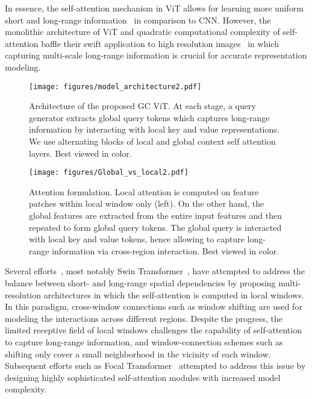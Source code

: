 \documentclass{article}
\theoremstyle{plain}
\theoremstyle{definition}
\theoremstyle{remark}
\begin{document}
In essence, the self-attention mechanism in ViT allows for learning more uniform short and long-range information~\citep{raghu2021vision} in comparison to CNN. However, the monolithic architecture of ViT and quadratic computational complexity of self-attention baffle their swift application to high resolution images~\citep{yang2021nvit} in which capturing multi-scale long-range information is crucial for accurate representation modeling. 

\begin{figure*}[t!]
\centering
    \texttt{[image: figures/model\_architecture2.pdf]}
  \caption{Architecture of the proposed GC ViT. At each stage, a query generator extracts global query tokens which captures long-range information by interacting with local key and value representations. We use alternating blocks of local and global context self attention layers. Best viewed in color.}
  \label{fig:model_architecture}
\end{figure*}

\begin{figure*}[t!]
\centering
    \texttt{[image: figures/Global\_vs\_local2.pdf]}
  \caption{Attention formulation. Local attention is computed on feature patches within local window only (left). On the other hand, the global features are extracted from the entire input features and then repeated to form global query tokens. The global query is interacted with local key and value tokens, hence allowing to capture long-range information via cross-region interaction. Best viewed in color.   
  }
  \label{fig:local_global_att}
\end{figure*}

Several efforts~\citep{liu2021swin,dong2022cswin,chu2021twins,tu2022maxvit}, most notably Swin Transformer~\citep{liu2021swin}, have attempted to address the balance between short- and long-range spatial dependencies by proposing multi-resolution architectures in which the self-attention is computed in local windows. In this paradigm, cross-window connections such as window shifting are used for modeling the interactions across different regions. Despite the progress, the limited receptive field of local windows challenges the capability of self-attention to capture long-range information, and window-connection schemes such as shifting only cover a small neighborhood in the vicinity of each window. Subsequent efforts such as Focal Transformer~\citep{yang2021focal} attempted to address this issue by designing highly sophisticated self-attention modules with increased model complexity. 
\end{document}
